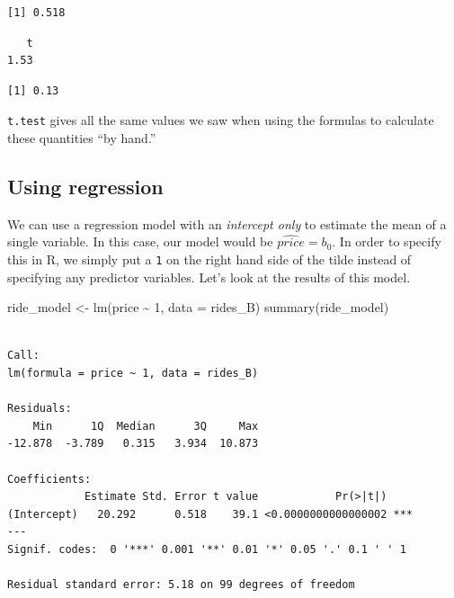 \documentclass[
  letterpaper,
  DIV=11,
  numbers=noendperiod]{scrreprt}
\newenvironment{Shaded}{\begin{snugshade}}{\end{snugshade}}
\newcommand{\AttributeTok}[1]{\textcolor[rgb]{0.40,0.45,0.13}{#1}}
\newcommand{\DecValTok}[1]{\textcolor[rgb]{0.68,0.00,0.00}{#1}}
\newcommand{\FunctionTok}[1]{\textcolor[rgb]{0.28,0.35,0.67}{#1}}
\newcommand{\NormalTok}[1]{\textcolor[rgb]{0.00,0.23,0.31}{#1}}
\newcommand{\OtherTok}[1]{\textcolor[rgb]{0.00,0.23,0.31}{#1}}
\newcommand{\SpecialCharTok}[1]{\textcolor[rgb]{0.37,0.37,0.37}{#1}}
\theoremstyle{definition}
\theoremstyle{remark}
\begin{document}
\begin{verbatim}
[1] 0.518
\end{verbatim}

\begin{Shaded}
\end{Shaded}

\begin{verbatim}
   t 
1.53 
\end{verbatim}

\begin{Shaded}
\end{Shaded}

\begin{verbatim}
[1] 0.13
\end{verbatim}

\texttt{t.test} gives all the same values we saw when using the formulas
to calculate these quantities ``by hand.''

\hypertarget{using-regression}{%
\subsection{Using regression}\label{using-regression}}

We can use a regression model with an \emph{intercept only} to estimate
the mean of a single variable. In this case, our model would be
\(\widehat{price} = b_0\). In order to specify this in R, we simply put
a \texttt{1} on the right hand side of the tilde instead of specifying
any predictor variables. Let's look at the results of this model.

\begin{Shaded}
\begin{Highlighting}[]
\NormalTok{ride\_model }\OtherTok{\textless{}{-}} \FunctionTok{lm}\NormalTok{(price }\SpecialCharTok{\textasciitilde{}} \DecValTok{1}\NormalTok{, }\AttributeTok{data =}\NormalTok{ rides\_B)}
\FunctionTok{summary}\NormalTok{(ride\_model)}
\end{Highlighting}
\end{Shaded}

\begin{verbatim}

Call:
lm(formula = price ~ 1, data = rides_B)

Residuals:
    Min      1Q  Median      3Q     Max 
-12.878  -3.789   0.315   3.934  10.873 

Coefficients:
            Estimate Std. Error t value            Pr(>|t|)    
(Intercept)   20.292      0.518    39.1 <0.0000000000000002 ***
---
Signif. codes:  0 '***' 0.001 '**' 0.01 '*' 0.05 '.' 0.1 ' ' 1

Residual standard error: 5.18 on 99 degrees of freedom
\end{verbatim}
\end{document}
